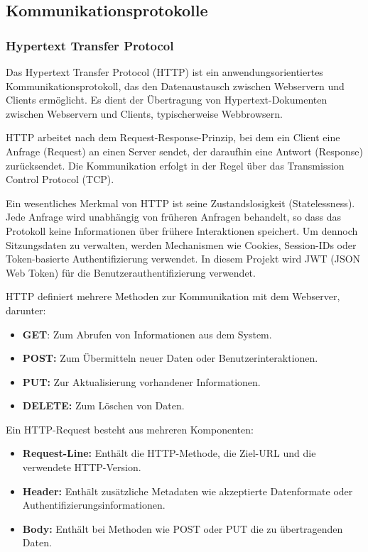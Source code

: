 \documentclass[12pt, letterpaper]{article}
\begin{document}
  \subsection{Kommunikationsprotokolle}
  \subsubsection[HTTP]{Hypertext Transfer Protocol}
  \par Das Hypertext Transfer Protocol (HTTP) ist ein anwendungsorientiertes Kommunikationsprotokoll, das den Datenaustausch zwischen Webservern und Clients ermöglicht. Es dient der Übertragung von Hypertext-Dokumenten zwischen Webservern und Clients, typischerweise Webbrowsern.
  \par HTTP arbeitet nach dem Request-Response-Prinzip, bei dem ein Client eine Anfrage (Request) an einen Server sendet, der daraufhin eine Antwort (Response) zurücksendet. Die Kommunikation erfolgt in der Regel über das Transmission Control Protocol (TCP).
  \par Ein wesentliches Merkmal von HTTP ist seine Zustandslosigkeit (Statelessness). Jede Anfrage wird unabhängig von früheren Anfragen behandelt, so dass das Protokoll keine Informationen über frühere Interaktionen speichert. Um dennoch Sitzungsdaten zu verwalten, werden Mechanismen wie Cookies, Session-IDs oder Token-basierte Authentifizierung verwendet. In diesem Projekt wird JWT (JSON Web Token) für die Benutzerauthentifizierung verwendet.
  \par HTTP definiert mehrere Methoden zur Kommunikation mit dem Webserver, darunter:
  \begin{itemize}
    \item \textbf{GET}: Zum Abrufen von Informationen aus dem System.
    \item \textbf{POST:} Zum Übermitteln neuer Daten oder Benutzerinteraktionen.
    \item \textbf{PUT:} Zur Aktualisierung vorhandener Informationen. 
    \item \textbf{DELETE:} Zum Löschen von Daten.
  \end{itemize}
  \par Ein HTTP-Request besteht aus mehreren Komponenten:
  \begin{itemize}
    \item \textbf{Request-Line:} Enthält die HTTP-Methode, die Ziel-URL und die verwendete HTTP-Version.
    \item \textbf{Header:} Enthält zusätzliche Metadaten wie akzeptierte Datenformate oder Authentifizierungsinformationen.
    \item \textbf{Body:} Enthält bei Methoden wie POST oder PUT die zu übertragenden Daten.
  \end{itemize}
\end{document}

